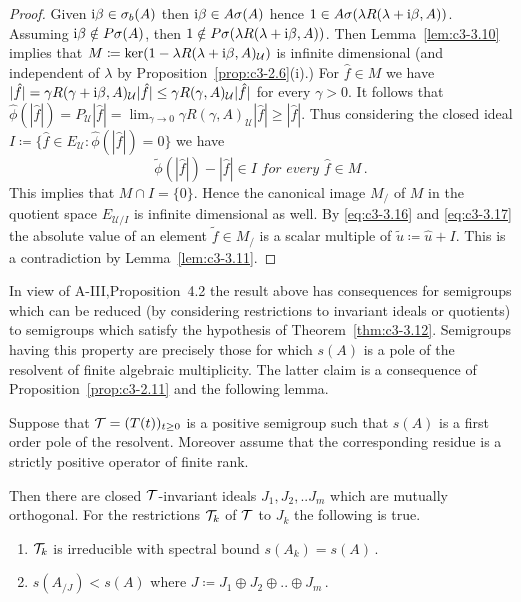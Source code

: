 \begin{proof}
	Given $\mathrm{i}\beta \in \sigma_{b}(A)$ then $\mathrm{i}\beta \in A\sigma(A)$ hence $1 \in A\sigma(\lambda R(\lambda+\mathrm{i}\beta,A))$.
	Assuming $\mathrm{i}\beta \notin P\sigma(A)$, then $1 \notin P\sigma(\lambda R(\lambda+\mathrm{i}\beta,A))$.
	Then Lemma~\ref{lem:c3-3.10} implies that $M \coloneqq \ker(1 - \lambda R(\lambda+\mathrm{i}\beta,A)_{\mathcal{U}})$ is infinite dimensional (and independent of $\lambda$ by Proposition~\ref{prop:c3-2.6}(i).)
	For $\hat{f} \in M$ we have $|\hat{f}| = \gamma R(\gamma+\mathrm{i}\beta,A)_{\mathcal{U}}|\hat{f}| \leq \gamma R(\gamma,A)_{\mathcal{U}}|\hat{f}|$ for every $\gamma > 0$.
	It follows that $\hat{\phi}(|\hat{f}|) = P_{\mathcal{U}}|\hat{f}| = \lim_{\gamma\to 0}\gamma R(\gamma,A)_{\mathcal{U}}|\hat{f}| \geq |\hat{f}|$.
	Thus considering the closed ideal $I \coloneqq \{\hat{f} \in E_{\mathcal{U}} \colon \hat{\phi}(|\hat{f}|) = 0\}$ we have
%
%
	\begin{equation}\label{eq:c3-3.17}
		\tilde{\phi}(|\hat{f}|) - |\hat{f}| \in I \textit{ for every } \hat{f} \in M\,.
	\end{equation}
	This implies that $M \cap I = \{0\}$. 
	Hence the canonical image $M_/$ of $M$ in the quotient space $E_{\mathcal{U}/{I}}$ is infinite dimensional as well. 
	By \eqref{eq:c3-3.16} and \eqref{eq:c3-3.17} the absolute value of an element $\tilde{f} \in M_/$ is a scalar multiple of $\tilde{u} \coloneqq \hat{u} + I$. 
	This is a contradiction by Lemma~\ref{lem:c3-3.11}.
\end{proof}

In view of A-III,Proposition~4.2 the result above has consequences for semigroups which can be reduced (by considering restrictions to invariant ideals or quotients) to semigroups which satisfy the hypothesis of Theorem~\ref{thm:c3-3.12}. 
Semigroups having this property are precisely those for which $s(A)$ is a pole of the resolvent of finite algebraic multiplicity. 
The latter claim is a consequence of Proposition~\ref{prop:c3-2.11} and the following lemma.

\begin{lemma}\label{lem:c3-3.13}
	Suppose that $\mathcal{T} = (T(t))_{t \ge 0}$ is a positive semigroup such that $s(A)$ is a first order pole of the resolvent. 
	Moreover assume that the corresponding residue is a strictly positive operator of finite rank.
	
	Then there are closed $\mathcal{T}$-invariant ideals $J_{1},J_{2}, .. J_{m}$ which are mutually orthogonal. 
	For the restrictions  $\mathcal{T}_{k}$ of $\mathcal{T}$ to $J_{k}$ the following is true.
	\begin{enumerate}[\upshape (i)]
		\item $\mathcal{T}_{k}$ is irreducible with spectral bound $s(A_k) = s(A)$\,.
		\item $s(A_{/J}) < s(A)$  where $J \coloneqq  J_{1}\oplus J_{2}\oplus .. \oplus J_{m}\,.$
	\end{enumerate}
\end{lemma}


